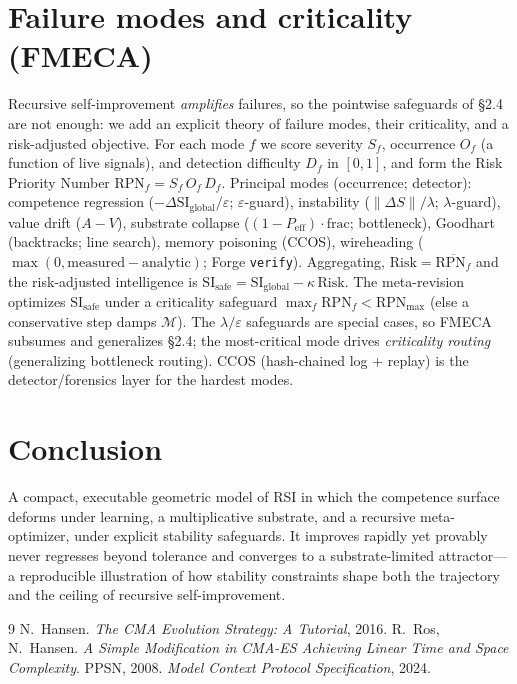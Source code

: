 \documentclass[11pt]{article}
\newcommand{\SI}{\mathrm{SI}_{\text{global}}}
\newcommand{\Peff}{P_{\text{eff}}}
\begin{document}
\section{Failure modes and criticality (FMECA)}
Recursive self-improvement \emph{amplifies} failures, so the pointwise
safeguards of \S2.4 are not enough: we add an explicit theory of failure modes,
their criticality, and a risk-adjusted objective. For each mode $f$ we score
severity $S_f$, occurrence $O_f$ (a function of live signals), and detection
difficulty $D_f$ in $[0,1]$, and form the Risk Priority Number
$\mathrm{RPN}_f = S_f\,O_f\,D_f$. Principal modes (occurrence; detector):
competence regression ($-\Delta\SI/\varepsilon$; $\varepsilon$-guard),
instability ($\lVert\Delta S\rVert/\lambda$; $\lambda$-guard), value drift
($A-V$), substrate collapse ($(1-\Peff)\cdot\text{frac}$; bottleneck), Goodhart
(backtracks; line search), memory poisoning (CCOS), wireheading
($\max(0,\text{measured}-\text{analytic})$; Forge \texttt{verify}). Aggregating,
$\mathrm{Risk}=\overline{\mathrm{RPN}_f}$ and the risk-adjusted intelligence is
$\mathrm{SI}_{\text{safe}} = \SI - \kappa\,\mathrm{Risk}$. The meta-revision optimizes
$\mathrm{SI}_{\text{safe}}$ under a criticality safeguard $\max_f \mathrm{RPN}_f <
\mathrm{RPN}_{\max}$ (else a conservative step damps $\mathcal{M}$). The
$\lambda/\varepsilon$ safeguards are special cases, so FMECA subsumes and
generalizes \S2.4; the most-critical mode drives \emph{criticality routing}
(generalizing bottleneck routing). CCOS (hash-chained log + replay) is the
detector/forensics layer for the hardest modes.

\section{Conclusion}
A compact, executable geometric model of RSI in which the competence surface
deforms under learning, a multiplicative substrate, and a recursive
meta-optimizer, under explicit stability safeguards. It improves rapidly yet
provably never regresses beyond tolerance and converges to a substrate-limited
attractor---a reproducible illustration of how stability constraints shape both
the trajectory and the ceiling of recursive self-improvement.

\begin{thebibliography}{9}
 N.\ Hansen. \emph{The CMA Evolution Strategy: A Tutorial}, 2016.
 R.\ Ros, N.\ Hansen. \emph{A Simple Modification in CMA-ES
Achieving Linear Time and Space Complexity}. PPSN, 2008.
 \emph{Model Context Protocol Specification}, 2024.
\end{thebibliography}
\end{document}
